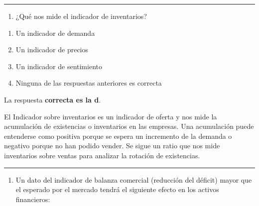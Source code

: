 \documentclass[
  letterpaper,
  DIV=11,
  numbers=noendperiod]{scrreprt}
\providecommand{\tightlist}{%
  \setlength{\itemsep}{0pt}\setlength{\parskip}{0pt}}\usepackage{longtable,booktabs,array}
\begin{document}
\begin{center}\rule{0.5\linewidth}{0.5pt}\end{center}

\begin{enumerate}
\def\labelenumi{\arabic{enumi}.}
\setcounter{enumi}{41}
\tightlist
\item
  ¿Qué nos mide el indicador de inventarios?
\end{enumerate}

\begin{enumerate}
\def\labelenumi{\alph{enumi})}
\item
  Un indicador de demanda
\item
  Un indicador de precios
\item
  Un indicador de sentimiento
\item
  Ninguna de las respuestas anteriores es correcta
\end{enumerate}

\begin{tcolorbox}[enhanced jigsaw, left=2mm, opacityback=0, colback=white, breakable, arc=.35mm, bottomrule=.15mm, rightrule=.15mm, toprule=.15mm, leftrule=.75mm, colframe=quarto-callout-tip-color-frame]
\begin{minipage}[t]{5.5mm}
\textcolor{quarto-callout-tip-color}{\faLightbulb}
\end{minipage}%
\begin{minipage}[t]{\textwidth - 5.5mm}

La respuesta \textbf{correcta es la d}.

El Indicador sobre inventarios es un indicador de oferta y nos mide la
acumulación de existencias o inventarios en las empresas. Una
acumulación puede entenderse como positiva porque se espera un
incremento de la demanda o negativo porque no han podido vender. Se
sigue un ratio que nos mide inventarios sobre ventas para analizar la
rotación de existencias.

\end{minipage}%
\end{tcolorbox}

\begin{center}\rule{0.5\linewidth}{0.5pt}\end{center}

\begin{enumerate}
\def\labelenumi{\arabic{enumi}.}
\setcounter{enumi}{42}
\tightlist
\item
  Un dato del indicador de balanza comercial (reducción del déficit)
  mayor que el esperado por el mercado tendrá el siguiente efecto en los
  activos financieros:
\end{enumerate}
\end{document}
